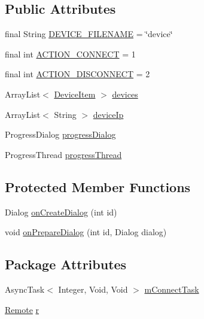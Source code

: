 \subsection*{\-Public \-Attributes}
\begin{DoxyCompactItemize}
\item 
final \-String \hyperlink{classcom_1_1axcoto_1_1shinjuku_1_1sushi_1_1_device_activity_a8dc5249305626e68b7e27ca3164f369c}{\-D\-E\-V\-I\-C\-E\-\_\-\-F\-I\-L\-E\-N\-A\-M\-E} = \char`\"{}device\char`\"{}
\item 
final int \hyperlink{classcom_1_1axcoto_1_1shinjuku_1_1sushi_1_1_device_activity_a5e97f8925a2febf6eb35d1b2217622f3}{\-A\-C\-T\-I\-O\-N\-\_\-\-C\-O\-N\-N\-E\-C\-T} = 1
\item 
final int \hyperlink{classcom_1_1axcoto_1_1shinjuku_1_1sushi_1_1_device_activity_a36511138d97f58bd9eea490d883425eb}{\-A\-C\-T\-I\-O\-N\-\_\-\-D\-I\-S\-C\-O\-N\-N\-E\-C\-T} = 2
\item 
\-Array\-List$<$ \hyperlink{classcom_1_1axcoto_1_1shinjuku_1_1maki_1_1_device_item}{\-Device\-Item} $>$ \hyperlink{classcom_1_1axcoto_1_1shinjuku_1_1sushi_1_1_device_activity_a3bc44a016145802ad56376304ad754c3}{devices}
\item 
\-Array\-List$<$ \-String $>$ \hyperlink{classcom_1_1axcoto_1_1shinjuku_1_1sushi_1_1_device_activity_a0f4b2ab01bd93f8f14fc3370c044bca1}{device\-Ip}
\item 
\-Progress\-Dialog \hyperlink{classcom_1_1axcoto_1_1shinjuku_1_1sushi_1_1_device_activity_a1d5efa5914b65e5097867ea92779c501}{progress\-Dialog}
\item 
\-Progress\-Thread \hyperlink{classcom_1_1axcoto_1_1shinjuku_1_1sushi_1_1_device_activity_a36d87d10b183916cb328fc0604ecd22c}{progress\-Thread}
\end{DoxyCompactItemize}
\subsection*{\-Protected \-Member \-Functions}
\begin{DoxyCompactItemize}
\item 
\-Dialog \hyperlink{classcom_1_1axcoto_1_1shinjuku_1_1sushi_1_1_device_activity_a3c6dd4273e9b563fbffdd8bad1cc6cf2}{on\-Create\-Dialog} (int id)
\item 
void \hyperlink{classcom_1_1axcoto_1_1shinjuku_1_1sushi_1_1_device_activity_ab7a28022e93c8600afe1878d779a1157}{on\-Prepare\-Dialog} (int id, \-Dialog dialog)
\end{DoxyCompactItemize}
\subsection*{\-Package \-Attributes}
\begin{DoxyCompactItemize}
\item 
\-Async\-Task$<$ \-Integer, \-Void, \-Void $>$ \hyperlink{classcom_1_1axcoto_1_1shinjuku_1_1sushi_1_1_device_activity_a0abadf85d0f7d5dd87312581a62d45ca}{m\-Connect\-Task}
\item 
\hyperlink{classcom_1_1axcoto_1_1shinjuku_1_1maki_1_1_remote}{\-Remote} \hyperlink{classcom_1_1axcoto_1_1shinjuku_1_1sushi_1_1_device_activity_a0e73f743b74362a313af6f4bc6057b9c}{r}
\end{DoxyCompactItemize}
